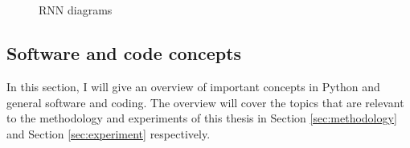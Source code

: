 \documentclass[report.tex]{subfiles}
\begin{document}
\begin{figure}[ht]
	\centering
	\\
	\\
	\caption{RNN diagrams}
	\label{fig:rnndiags}
\end{figure}

\newpagefill

\subsection{Software and code concepts}
\label{sec:softcode}

In this section, I will give an overview of important concepts in Python and general software and coding. The overview will cover the topics that are relevant to the methodology and experiments of this thesis in Section \ref{sec:methodology} and Section \ref{sec:experiment} respectively.
\end{document}
